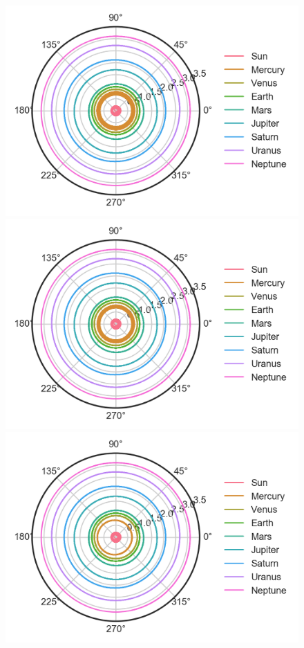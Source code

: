 \documentclass[aps,prc,reprint,nobalancelastpage]{revtex4-1}
\begin{document}
        \begin{figure}
            \includegraphics{planets_euler.png}
            \includegraphics{planets_verlet.png}
            \includegraphics{planets_rk4.png}

\end{figure}
\end{document}
